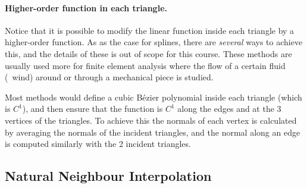 \paragraph{Higher-order function in each triangle.}
Notice that it is possible to modify the linear function inside each triangle by a higher-order function.
As as the case for splines, there are \emph{several} ways to achieve this, and the details of these is out of scope for this course.
These methods are usually used more for finite element analysis where the flow of a certain fluid (\eg\ wind) around or through a mechanical piece is studied.

%

Most methods would define a cubic Bézier polynomial inside each triangle (which is $C^1$), and then ensure that the function is $C^1$ along the edges and at the 3 vertices of the triangles.
To achieve this the normals of each vertex is calculated by averaging the normals of the incident triangles, and the normal along an edge is computed similarly with the 2 incident triangles.



\subsection{Natural Neighbour Interpolation}

